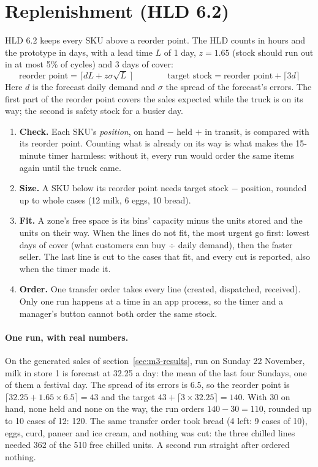 \section{Replenishment (HLD 6.2)}
\label{sec:m3-replenishment}

HLD 6.2 keeps every SKU above a reorder point. The HLD counts in hours and the prototype in days, with a lead time $L$
of 1 day, $z = 1.65$ (stock should run out in at most 5\% of cycles) and 3 days of cover:
\[
  \textrm{reorder point} = \bigl\lceil dL + z\sigma\sqrt{L}\, \bigr\rceil \qquad\qquad
  \textrm{target stock} = \textrm{reorder point} + \lceil 3d \rceil
\]
Here $d$ is the forecast daily demand and $\sigma$ the spread of the forecast's errors. The first part of the reorder
point covers the sales expected while the truck is on its way; the second is safety stock for a busier day.

\begin{enumerate}
  \item \textbf{Check.} Each SKU's \emph{position}, on hand $-$ held $+$ in transit, is compared with its reorder
    point. Counting what is already on its way is what makes the 15-minute timer harmless: without it, every run would
    order the same items again until the truck came.
  \item \textbf{Size.} A SKU below its reorder point needs target stock $-$ position, rounded up to whole cases
    (12 milk, 6 eggs, 10 bread).
  \item \textbf{Fit.} A zone's free space is its bins' capacity minus the units stored and the units on their way.
    When the lines do not fit, the most urgent go first: lowest days of cover (what customers can buy $\div$ daily
    demand), then the faster seller. The last line is cut to the cases that fit, and every cut is reported, also when
    the timer made it.
  \item \textbf{Order.} One transfer order takes every line (created, dispatched, received). Only one run happens at a
    time in an app process, so the timer and a manager's button cannot both order the same stock.
\end{enumerate}

\paragraph{One run, with real numbers.} On the generated sales of section~\ref{sec:m3-results}, run on Sunday
22 November, milk in store 1 is forecast at 32.25 a day: the mean of the last four Sundays, one of them a festival day.
The spread of its errors is 6.5, so the reorder point is $\lceil 32.25 + 1.65 \times 6.5 \rceil = 43$ and the target
$43 + \lceil 3 \times 32.25 \rceil = 140$. With 30 on hand, none held and none on the way, the run orders
$140 - 30 = 110$, rounded up to 10 cases of 12: 120. The same transfer order took bread (4 left: 9 cases of 10), eggs,
curd, paneer and ice cream, and nothing was cut: the three chilled lines needed 362 of the 510 free chilled units. A
second run straight after ordered nothing.

